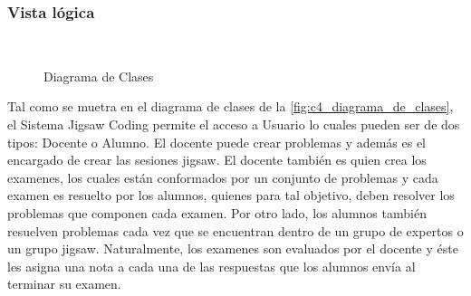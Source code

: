 \subsubsection{Vista lógica}
\begin{figure}[!h]
\centering
\\
\caption{Diagrama de Clases}\label{fig:c4_diagrama_de_clases}
\end{figure}

Tal como se muetra en el diagrama de clases de la \autoref{fig:c4_diagrama_de_clases}, el Sistema Jigsaw Coding permite el acceso a Usuario lo cuales pueden ser de dos tipos: Docente o Alumno. El docente puede crear problemas y además es el encargado de crear las sesiones jigsaw. El docente también es quien crea los examenes, los cuales están conformados por un conjunto de problemas y cada examen es resuelto por los alumnos, quienes para tal objetivo, deben resolver los problemas que componen cada examen. Por otro lado, los alumnos también resuelven problemas cada vez que se encuentran dentro de un grupo de expertos o un grupo jigsaw. Naturalmente, los examenes son evaluados por el docente y éste les asigna una nota a cada una de las respuestas que los alumnos envía al terminar su examen.

